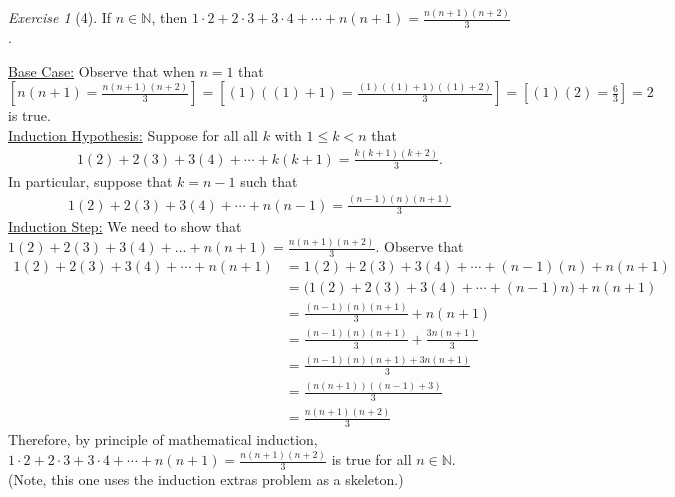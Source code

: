 \documentclass[12pt]{amsart}
\makeatletter
\theoremstyle{remark}
\newtheorem*{exercise}{Exercise}%
\def\NN{\ensuremath{\mathbb N}}
\renewenvironment{proof}[1][\proofname]{\par\doublespacing
  \pushQED{\qed}%
  \normalfont \topsep6\p@\@plus6\p@\relax
  \list{}{%
    \settowidth{\leftmargin}{\itshape\proofname:\hskip\labelsep}%
    \setlength{\labelwidth}{0pt}%
    \setlength{\itemindent}{-\leftmargin}%
  }%
  \item[\hskip\labelsep\itshape#1\@addpunct{:}]\ignorespaces
}{%
  \popQED\endlist\@endpefalse
  \singlespacing
}
\theoremstyle{mycomment}
\makeatother
\begin{document}
\begin{exercise}[4] If $n\in\NN$, then $1\cdot 2+2\cdot 3+3\cdot 4+\cdots+n(n+1)=\frac{n(n+1)(n+2)}{3}$.
\begin{proof}%
  \underline{Base Case:} Observe that when $n = 1$ that $\left[n(n+1) = \frac{n(n+1)(n+2)}{3}\right] = \left[(1)((1)+ 1) = \frac{(1)((1)+1)((1) + 2)}{3}\right] = \left[(1)(2) = \frac{6}{3} \right] = 2$ is true. \\
  \underline{Induction Hypothesis:} Suppose for all all $k$ with $1 \leq k < n$ that
  \begin{align*}
    1(2) + 2(3) + 3(4) + \cdots + k(k+1) = \frac{k(k+1)(k+2)}{3}.
  \end{align*}
  In particular, suppose that $k = n-1$ such that
  \begin{align*}
    1(2) + 2(3) + 3(4) + \cdots + n(n-1) = \frac{(n-1)(n)(n+1)}{3}
  \end{align*}
  \underline{Induction Step:} We need to show that $1(2) + 2(3) + 3(4)+...+ n(n+1) = \frac{n(n+1)(n+2)}{3}$.  Observe that
  \begin{align*}
    1(2) + 2(3) + 3(4) + \cdots + n(n+1) &= 1(2) + 2(3) + 3(4) + \cdots + (n-1)(n) + n(n+1) \\
                                         &= \biggl(1(2) + 2(3) + 3(4) + \cdots + (n-1)n\biggr) + n(n+1) \\
                                         &= \frac{(n-1)(n)(n+1)}{3} + n(n+1) \\
                                         &= \frac{(n-1)(n)(n+1)}{3} + \frac{3n(n+1)}{3} \\
                                         &= \frac{(n-1)(n)(n+1) + 3n(n+1)}{3} \\
                                         &= \frac{(n(n+1))((n-1)+3)}{3} \\
                                         &= \frac{n(n+1)(n+2)}{3}
  \end{align*}
Therefore, by principle of mathematical induction, $1\cdot 2+2\cdot 3+3\cdot 4+\cdots+n(n+1)=\frac{n(n+1)(n+2)}{3}$ is true for all $n \in \NN$.\\
(Note, this one uses the induction extras problem as a skeleton.)
\end{proof}
\end{exercise}
\end{document}
